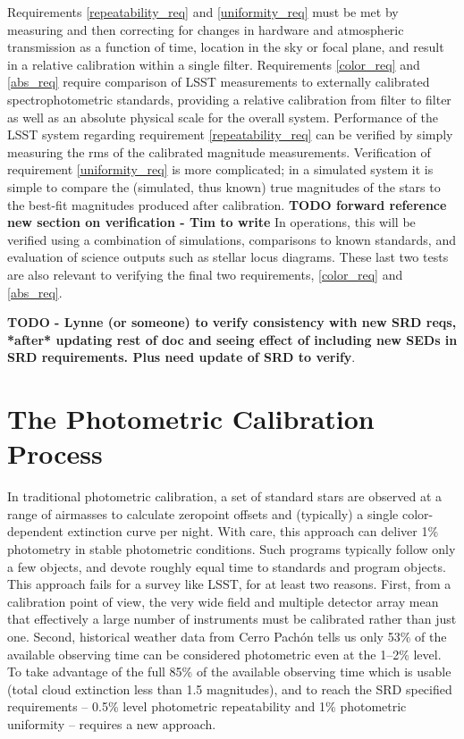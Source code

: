 \documentclass[12pt,preprint]{aastex}
\begin{document}
Requirements \ref{repeatability_req} and \ref{uniformity_req} must be
met by measuring and then correcting for changes in hardware and
atmospheric transmission as a function of time, location in the sky or
focal plane, and result in a relative calibration within a single
filter. Requirements \ref{color_req} and \ref{abs_req} require
comparison of LSST measurements to externally calibrated
spectrophotometric standards, providing a relative calibration from
filter to filter as well as an absolute physical scale for the overall
system.  Performance of the LSST system regarding requirement
\ref{repeatability_req} can be verified by simply measuring the rms of
the calibrated magnitude measurements. Verification of requirement
\ref{uniformity_req} is more complicated; in a simulated system it is
simple to compare the (simulated, thus known) true magnitudes of the
stars to the best-fit magnitudes produced after calibration. {\bf TODO forward reference new section on verification - Tim to write} 
In operations, this will be verified using a combination of simulations,
comparisons to known standards, and evaluation of science outputs such
as stellar locus diagrams. These last two tests are also relevant to
verifying the final two requirements, \ref{color_req} and
\ref{abs_req}.

{\bf TODO - Lynne (or someone) to verify consistency with new SRD reqs, *after* updating rest of doc and seeing effect of including new SEDs in SRD requirements. Plus need update of SRD to verify}. 


\section{The Photometric Calibration Process}
\label{sec:calib_overview}

In traditional photometric calibration, a set of standard stars are
observed at a range of airmasses to calculate zeropoint offsets and
(typically) a single color-dependent extinction curve per night. With care,
this approach can deliver 1\% photometry in stable photometric conditions.
Such programs typically follow only a few objects, and devote roughly equal
time to standards and program objects.   This approach fails for a survey like
LSST, for at least two reasons.  First, from a calibration point of view, 
the very wide field and multiple detector array mean that effectively a large number of instruments must be
calibrated rather than just one.
Second, historical weather data from Cerro Pach\'{o}n tells us
only 53\% of the available observing time can be considered
photometric even at the 1--2\% level. To take advantage of the full
85\% of the available observing time which is usable (total cloud
extinction less than 1.5 magnitudes), and to reach the SRD specified
requirements -- 0.5\% level photometric repeatability and 1\%
photometric uniformity -- requires a new approach.
\end{document}
